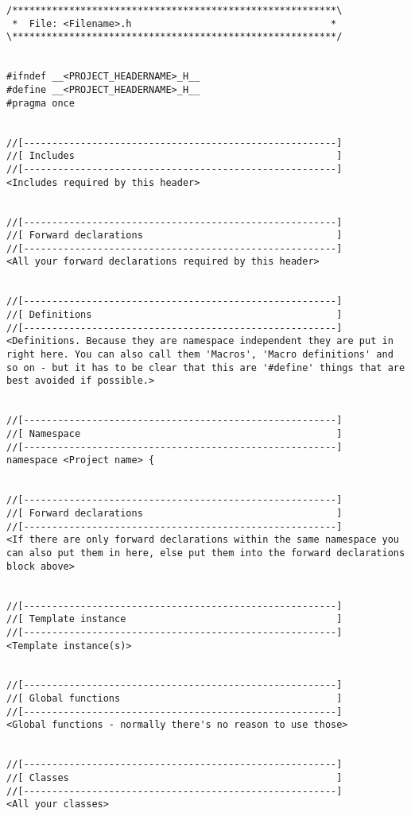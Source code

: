 \begin{lstlisting}[caption=Complete header layout]
/*********************************************************\
 *  File: <Filename>.h                                   *
\*********************************************************/


#ifndef __<PROJECT_HEADERNAME>_H__
#define __<PROJECT_HEADERNAME>_H__
#pragma once


//[-------------------------------------------------------]
//[ Includes                                              ]
//[-------------------------------------------------------]
<Includes required by this header>


//[-------------------------------------------------------]
//[ Forward declarations                                  ]
//[-------------------------------------------------------]
<All your forward declarations required by this header>


//[-------------------------------------------------------]
//[ Definitions                                           ]
//[-------------------------------------------------------]
<Definitions. Because they are namespace independent they are put in right here. You can also call them 'Macros', 'Macro definitions' and so on - but it has to be clear that this are '#define' things that are best avoided if possible.>


//[-------------------------------------------------------]
//[ Namespace                                             ]
//[-------------------------------------------------------]
namespace <Project name> {


//[-------------------------------------------------------]
//[ Forward declarations                                  ]
//[-------------------------------------------------------]
<If there are only forward declarations within the same namespace you can also put them in here, else put them into the forward declarations block above>


//[-------------------------------------------------------]
//[ Template instance                                     ]
//[-------------------------------------------------------]
<Template instance(s)>


//[-------------------------------------------------------]
//[ Global functions                                      ]
//[-------------------------------------------------------]
<Global functions - normally there's no reason to use those>


//[-------------------------------------------------------]
//[ Classes                                               ]
//[-------------------------------------------------------]
<All your classes>



\end{lstlisting}
